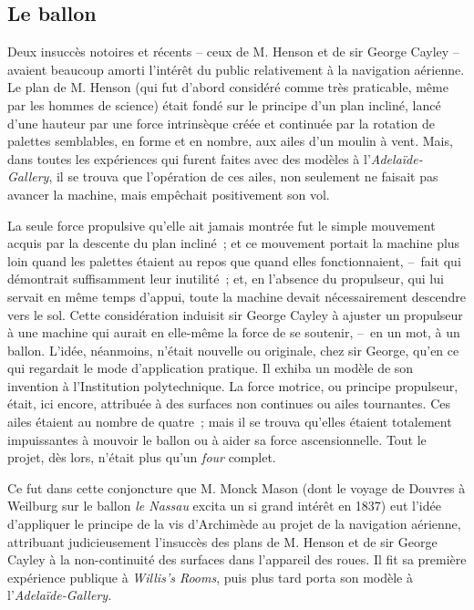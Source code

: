 \documentclass[french,twoside]{book} %
\begin{document}
\subsection[{Le ballon}]{Le ballon}
\noindent Deux insuccès notoires et récents – ceux de M. Henson et de sir George Cayley – avaient beaucoup amorti l’intérêt du public relativement à la navigation aérienne. Le plan de M. Henson (qui fut d’abord considéré comme très praticable, même par les hommes de science) était fondé sur le principe d’un plan incliné, lancé d’une hauteur par une force intrinsèque créée et continuée par la rotation de palettes semblables, en forme et en nombre, aux ailes d’un moulin à vent. Mais, dans toutes les expériences qui furent faites avec des modèles à l’\emph{Adelaïde-Gallery}, il se trouva que l’opération de ces ailes, non seulement ne faisait pas avancer la machine, mais empêchait positivement son vol.\par
La seule force propulsive qu’elle ait jamais montrée fut le simple mouvement acquis par la descente du plan incliné ; et ce mouvement portait la machine plus loin quand les palettes étaient au repos que quand elles fonctionnaient, – fait qui démontrait suffisamment leur inutilité ; et, en l’absence du propulseur, qui lui servait en même temps d’appui, toute la machine devait nécessairement descendre vers le sol. Cette considération induisit sir George Cayley à ajuster un propulseur à une machine qui aurait en elle-même la force de se soutenir, – en un mot, à un ballon. L’idée, néanmoins, n’était nouvelle ou originale, chez sir George, qu’en ce qui regardait le mode d’application pratique. Il exhiba un modèle de son invention à l’Institution polytechnique. La force motrice, ou principe propulseur, était, ici encore, attribuée à des surfaces non continues ou ailes tournantes. Ces ailes étaient au nombre de quatre ; mais il se trouva qu’elles étaient totalement impuissantes à mouvoir le ballon ou à aider sa force ascensionnelle. Tout le projet, dès lors, n’était plus qu’un\emph{ four} complet.\par
Ce fut dans cette conjoncture que M. Monck Mason (dont le voyage de Douvres à Weilburg sur le ballon \emph{le Nassau} excita un si grand intérêt en 1837) eut l’idée d’appliquer le principe de la vis d’Archimède au projet de la navigation aérienne, attribuant judicieusement l’insuccès des plans de M. Henson et de sir George Cayley à la non-continuité des surfaces dans l’appareil des roues. Il fit sa première expérience publique à \emph{Willis’s Rooms}, puis plus tard porta son modèle à l’\emph{Adelaïde-Gallery.}\par
\end{document}
